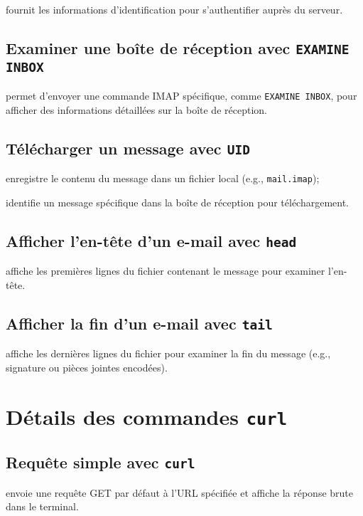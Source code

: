 \documentclass[a4paper]{report}
\begin{document}
    fournit les informations d'identification pour s'authentifier 
    auprès du serveur.

\subsection{Examiner une boîte de réception avec \texttt{EXAMINE INBOX}}
    permet d'envoyer une commande IMAP spécifique, comme 
    \texttt{EXAMINE INBOX}, pour afficher des informations détaillées 
    sur la boîte de réception.

\subsection{Télécharger un message avec \texttt{UID}}
    enregistre le contenu du message dans un fichier local (e.g., 
    \texttt{mail.imap});

    identifie un message spécifique dans la boîte de réception pour 
    téléchargement.

\subsection{Afficher l'en-tête d'un e-mail avec \texttt{head}}
    affiche les premières lignes du fichier contenant le message pour 
    examiner l'en-tête.

\subsection{Afficher la fin d'un e-mail avec \texttt{tail}}
    affiche les dernières lignes du fichier pour examiner la fin 
    du message (e.g., signature ou pièces jointes encodées).


\section{Détails des commandes \texttt{curl}}
\subsection{Requête simple avec \texttt{curl}}
envoie une requête GET par défaut à l'URL spécifiée et affiche la réponse brute 
dans le terminal.
\end{document}
